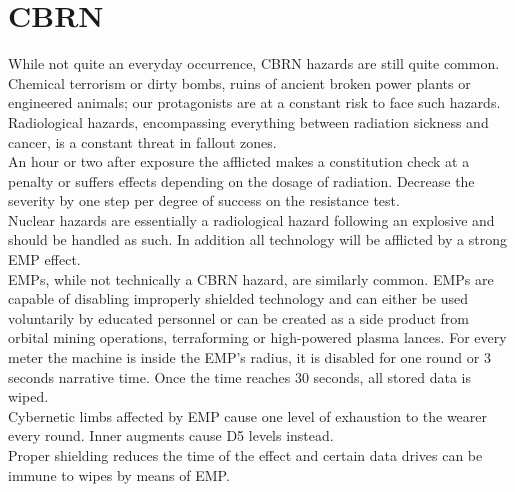 \documentclass[12pt,a4paper,openany]{book}
\begin{document}
	\section{CBRN}
	While not quite an everyday occurrence, CBRN hazards are still quite common. Chemical terrorism or dirty bombs, ruins of ancient broken power plants or engineered animals; our protagonists are at a constant risk to face such hazards.\\
	Radiological hazards, encompassing everything between radiation sickness and cancer, is a constant threat in fallout zones.\\
	An hour or two after exposure the afflicted makes a constitution check at a penalty or suffers effects depending on the dosage of radiation. Decrease the severity by one step per degree of success on the resistance test.\\
	Nuclear hazards are essentially a radiological hazard following an explosive and should be handled as such. In addition all technology will be afflicted by a strong EMP effect.\\
	EMPs, while not technically a CBRN hazard, are similarly common. EMPs are capable of disabling improperly shielded technology and can either be used voluntarily by educated personnel or can be created as a side product from orbital mining operations, terraforming or high-powered plasma lances. For every meter the machine is inside the EMP’s radius, it is disabled for one round or 3 seconds narrative time. Once the time reaches 30 seconds, all stored data is wiped.\\
	Cybernetic limbs affected by EMP cause one level of exhaustion to the wearer every round. Inner augments cause D5 levels instead.\\
	Proper shielding reduces the time of the effect and certain data drives can be immune to wipes by means of EMP.
\end{document}
